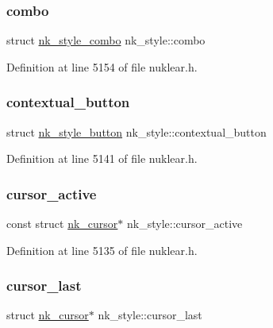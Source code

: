 \subsubsection{\texorpdfstring{combo}{combo}}
{\footnotesize\ttfamily struct \mbox{\hyperlink{structnk__style__combo}{nk\+\_\+style\+\_\+combo}} nk\+\_\+style\+::combo}



Definition at line 5154 of file nuklear.\+h.

\mbox{\label{structnk__style_a22d7362fed90d872bca7e51c3281d10b}} 
\subsubsection{\texorpdfstring{contextual\+\_\+button}{contextual\_button}}
{\footnotesize\ttfamily struct \mbox{\hyperlink{structnk__style__button}{nk\+\_\+style\+\_\+button}} nk\+\_\+style\+::contextual\+\_\+button}



Definition at line 5141 of file nuklear.\+h.

\mbox{\label{structnk__style_ac9b1221879c981b2afc829e819aaee5a}} 
\subsubsection{\texorpdfstring{cursor\+\_\+active}{cursor\_active}}
{\footnotesize\ttfamily const struct \mbox{\hyperlink{structnk__cursor}{nk\+\_\+cursor}}$\ast$ nk\+\_\+style\+::cursor\+\_\+active}



Definition at line 5135 of file nuklear.\+h.

\mbox{\label{structnk__style_a90fbf5f270f36ec466bef6a0591fb37b}} 
\subsubsection{\texorpdfstring{cursor\+\_\+last}{cursor\_last}}
{\footnotesize\ttfamily struct \mbox{\hyperlink{structnk__cursor}{nk\+\_\+cursor}}$\ast$ nk\+\_\+style\+::cursor\+\_\+last}



